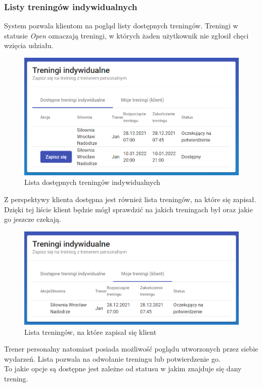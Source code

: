 \documentclass[a4paper,twoside,12pt]{book}
\begin{document}
{\subsubsection{Listy treningów indywidualnych}
System pozwala klientom na pogląd listy dostępnych treningów. Treningi w statusie \textit{Open} oznaczają treningi, w których żaden użytkownik nie zgłosił chęci wzięcia udziału.
\begin{figure}[h!]
	\centering
	\includegraphics[width=1\linewidth]{../zrzuty_ekranu/dzialanie/treningi/klient_dostepne_treningi}
	\caption{Lista dostępnych treningów indywidualnych}
	\label{fig:klientdostepnetreningi}
\end{figure}
\FloatBarrier
Z perspektywy klienta dostępna jest również lista treningów, na które się zapisał. Dzięki tej liście klient będzie mógł sprawdzić na jakich treningach był oraz jakie go jeszcze czekają.
\begin{figure}[h!]
	\centering
	\includegraphics[width=1\linewidth]{../zrzuty_ekranu/dzialanie/treningi/klient_lista_treningow}
	\caption{Lista treningów, na które zapisał się klient}
	\label{fig:klientlistatreningow}
\end{figure}
\FloatBarrier
Trener personalny natomiast posiada możliwość poglądu utworzonych przez siebie wydarzeń. Lista pozwala na odwołanie treningu lub potwierdzenie go.\\To jakie opcje są dostępne jest zależne od statusu w jakim znajduje się dany trening.
}
\end{document}
